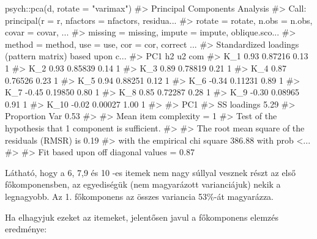 \documentclass[
  letterpaper,
]{krantz}
\makeatletter
\newenvironment{Shaded}{\begin{snugshade}}{\end{snugshade}}
\newcommand{\AttributeTok}[1]{\textcolor[rgb]{0.40,0.45,0.13}{#1}}
\newcommand{\CommentTok}[1]{\textcolor[rgb]{0.37,0.37,0.37}{#1}}
\newcommand{\FunctionTok}[1]{\textcolor[rgb]{0.28,0.35,0.67}{#1}}
\newcommand{\NormalTok}[1]{\textcolor[rgb]{0.00,0.23,0.31}{#1}}
\newcommand{\SpecialCharTok}[1]{\textcolor[rgb]{0.37,0.37,0.37}{#1}}
\newcommand{\StringTok}[1]{\textcolor[rgb]{0.13,0.47,0.30}{#1}}
\newenvironment{kframe}{%
\medskip{}
\setlength{\fboxsep}{.8em}
 \def\at@end@of@kframe{}%
 \ifinner\ifhmode%
  \def\at@end@of@kframe{\end{minipage}}%
  \begin{minipage}{\columnwidth}%
 \fi\fi%
 \def\FrameCommand##1{\hskip\@totalleftmargin \hskip-\fboxsep
 \colorbox{shadecolor}{##1}\hskip-\fboxsep
     \hskip-\linewidth \hskip-\@totalleftmargin \hskip\columnwidth}%
 \MakeFramed {\advance\hsize-\width
   \@totalleftmargin\z@ \linewidth\hsize
   \@setminipage}}%
 {\par\unskip\endMakeFramed%
 \at@end@of@kframe}
\renewenvironment{Shaded}{\begin{kframe}}{\end{kframe}}
\makeatother
\begin{document}
\begin{Shaded}
\begin{Highlighting}[]
\NormalTok{psych}\SpecialCharTok{::}\FunctionTok{pca}\NormalTok{(d, }\AttributeTok{rotate =} \StringTok{"varimax"}\NormalTok{)}
\CommentTok{\#\textgreater{} Principal Components Analysis}
\CommentTok{\#\textgreater{} Call: principal(r = r, nfactors = nfactors, residua...}
\CommentTok{\#\textgreater{}     rotate = rotate, n.obs = n.obs, covar = covar, ...}
\CommentTok{\#\textgreater{}     missing = missing, impute = impute, oblique.sco...}
\CommentTok{\#\textgreater{}     method = method, use = use, cor = cor, correct ...}
\CommentTok{\#\textgreater{} Standardized loadings (pattern matrix) based upon c...}
\CommentTok{\#\textgreater{}        PC1      h2   u2 com}
\CommentTok{\#\textgreater{} K\_1   0.93 0.87216 0.13   1}
\CommentTok{\#\textgreater{} K\_2   0.93 0.85839 0.14   1}
\CommentTok{\#\textgreater{} K\_3   0.89 0.78819 0.21   1}
\CommentTok{\#\textgreater{} K\_4   0.87 0.76526 0.23   1}
\CommentTok{\#\textgreater{} K\_5   0.94 0.88251 0.12   1}
\CommentTok{\#\textgreater{} K\_6  {-}0.34 0.11231 0.89   1}
\CommentTok{\#\textgreater{} K\_7  {-}0.45 0.19850 0.80   1}
\CommentTok{\#\textgreater{} K\_8   0.85 0.72287 0.28   1}
\CommentTok{\#\textgreater{} K\_9  {-}0.30 0.08965 0.91   1}
\CommentTok{\#\textgreater{} K\_10 {-}0.02 0.00027 1.00   1}
\CommentTok{\#\textgreater{} }
\CommentTok{\#\textgreater{}                 PC1}
\CommentTok{\#\textgreater{} SS loadings    5.29}
\CommentTok{\#\textgreater{} Proportion Var 0.53}
\CommentTok{\#\textgreater{} }
\CommentTok{\#\textgreater{} Mean item complexity =  1}
\CommentTok{\#\textgreater{} Test of the hypothesis that 1 component is sufficient.}
\CommentTok{\#\textgreater{} }
\CommentTok{\#\textgreater{} The root mean square of the residuals (RMSR) is  0.19 }
\CommentTok{\#\textgreater{}  with the empirical chi square  386.88  with prob \textless{}...}
\CommentTok{\#\textgreater{} }
\CommentTok{\#\textgreater{} Fit based upon off diagonal values = 0.87}
\end{Highlighting}
\end{Shaded}

Látható, hogy a 6, 7,9 és 10 -es itemek nem nagy súllyal vesznek részt
az első főkomponensben, az egyediségük (nem magyarázott varianciájuk)
nekik a legnagyobb. Az 1. főkomponens az összes variancia 53\%-át
magyarázza.

Ha elhagyjuk ezeket az itemeket, jelentősen javul a főkomponens elemzés
eredménye:
\end{document}
